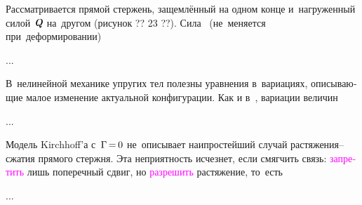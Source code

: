 

\begin{otherlanguage}{russian}

Рассматривается прямой стержень, защемлённый на одном конце и~нагруженный силой~$\mathboldQ$ на~другом (рисунок ?? 23 ??). Сила ~(не~меняется при~деформировании)

...



\end{otherlanguage}



\begin{otherlanguage}{russian}

В~нелинейной механике упругих тел полезны уравнения в~вариациях, описывающие малое изменение актуальной конфигурации. Как и в~, вариации величин

...



\end{otherlanguage}



\begin{otherlanguage}{russian}

Модель Kirchhoff’а с~${\Gamma \hspace{-0.25ex}=\hspace{-0.2ex} 0}$ не~описывает наипростейший случай растяжения\hbox{--}сжатия прямого стержня. Эта неприятность исчезнет, если смягчить связь: \textcolor{magenta}{запретить} лишь поперечный сдвиг, но \textcolor{magenta}{разрешить} растяжение, то~есть

...



\end{otherlanguage}

